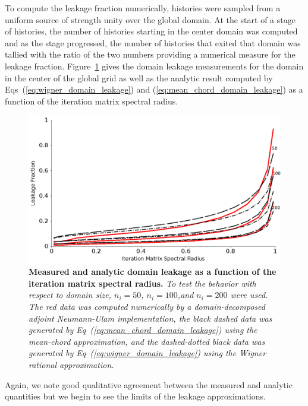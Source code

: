 To compute the leakage fraction numerically,  histories were
sampled from a uniform source of strength unity over the global
domain. At the start of a stage of histories, the number of histories
starting in the center domain was computed and as the stage
progressed, the number of histories that exited that domain was
tallied with the ratio of the two numbers providing a numerical
measure for the leakage fraction. Figure~\ref{fig:measured_leakage}
gives the domain leakage measurements for the domain in the center of
the global grid as well as the analytic result computed by
Eqs~(\ref{eq:wigner_domain_leakage}) and
(\ref{eq:mean_chord_domain_leakage}) as a function of the iteration
matrix spectral radius.
\begin{figure}[t!]
  \begin{spacing}{1.0}
    \begin{center}
      \includegraphics[width=6.0in,clip]{chapters/parallel_mc/leakage_variation_2.pdf}
    \end{center}
    \caption{\textbf{Measured and analytic domain leakage as a
        function of the iteration matrix spectral radius.} \textit{To
        test the behavior with respect to domain size, $n_i=50$,
        $n_i=100$,and $n_i=200$ were used. The red data was computed
        numerically by a domain-decomposed adjoint Neumann-Ulam
        implementation, the black dashed data was generated by
        Eq~(\ref{eq:mean_chord_domain_leakage}) using the mean-chord
        approximation, and the dashed-dotted black data was generated
        by Eq~(\ref{eq:wigner_domain_leakage}) using the Wigner
        rational approximation.}}
    \label{fig:measured_leakage}
  \end{spacing}
\end{figure}
Again, we note good qualitative agreement between the measured and
analytic quantities but we begin to see the limits of the leakage
approximations. 

